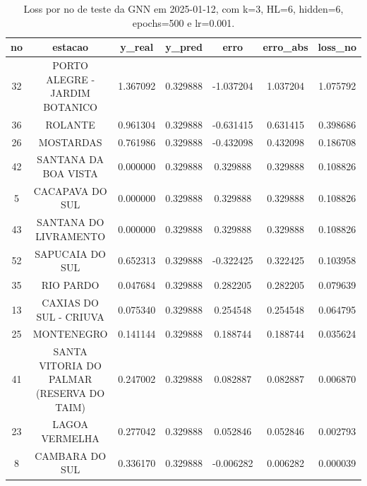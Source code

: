 \begin{table}[h]
\centering
\caption{Loss por no de teste da GNN em 2025-01-12, com k=3, HL=6, hidden=6, epochs=500 e lr=0.001.}
\label{tab:gnn_loss_k3_hl6_h6_e500_d20250112}
\begin{tabular}{ccccccc}
\toprule
no & estacao & y\_real & y\_pred & erro & erro\_abs & loss\_no \\
\midrule
32 & PORTO ALEGRE - JARDIM BOTANICO & 1.367092 & 0.329888 & -1.037204 & 1.037204 & 1.075792 \\
36 & ROLANTE & 0.961304 & 0.329888 & -0.631415 & 0.631415 & 0.398686 \\
26 & MOSTARDAS & 0.761986 & 0.329888 & -0.432098 & 0.432098 & 0.186708 \\
42 & SANTANA DA BOA VISTA & 0.000000 & 0.329888 & 0.329888 & 0.329888 & 0.108826 \\
5 & CACAPAVA DO SUL & 0.000000 & 0.329888 & 0.329888 & 0.329888 & 0.108826 \\
43 & SANTANA DO LIVRAMENTO & 0.000000 & 0.329888 & 0.329888 & 0.329888 & 0.108826 \\
52 & SAPUCAIA DO SUL & 0.652313 & 0.329888 & -0.322425 & 0.322425 & 0.103958 \\
35 & RIO PARDO & 0.047684 & 0.329888 & 0.282205 & 0.282205 & 0.079639 \\
13 & CAXIAS DO SUL - CRIUVA & 0.075340 & 0.329888 & 0.254548 & 0.254548 & 0.064795 \\
25 & MONTENEGRO & 0.141144 & 0.329888 & 0.188744 & 0.188744 & 0.035624 \\
41 & SANTA VITORIA DO PALMAR (RESERVA DO TAIM) & 0.247002 & 0.329888 & 0.082887 & 0.082887 & 0.006870 \\
23 & LAGOA VERMELHA & 0.277042 & 0.329888 & 0.052846 & 0.052846 & 0.002793 \\
8 & CAMBARA DO SUL & 0.336170 & 0.329888 & -0.006282 & 0.006282 & 0.000039 \\
\bottomrule
\end{tabular}
\end{table}
